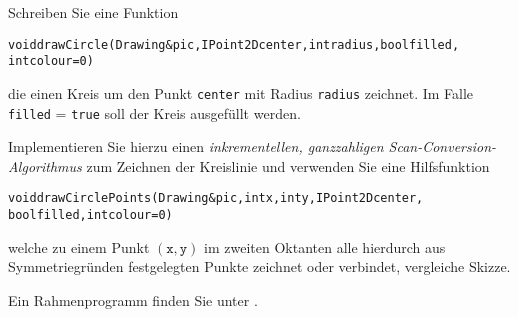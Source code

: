 %
Schreiben Sie eine Funktion
\begin{alltt}
   void drawCircle(Drawing& pic, IPoint2D center, int radius, bool filled,
                   int colour = 0)
\end{alltt}
die einen Kreis um den Punkt \texttt{center} mit Radius
\texttt{radius} zeichnet. Im Falle \texttt{filled} = \texttt{true}
soll der Kreis ausgefüllt werden. 

Implementieren Sie hierzu einen
\emph{inkrementellen, ganzzahligen Scan-Conversion-Algorithmus} zum
Zeichnen der Kreislinie und verwenden Sie eine Hilfsfunktion
\begin{alltt}
   void drawCirclePoints(Drawing& pic, int x, int y, IPoint2D center,
                         bool filled, int colour = 0)
\end{alltt}
welche zu einem Punkt $(\texttt{x}, \texttt{y})$ im zweiten Oktanten
alle hierdurch aus Symmetriegründen festgelegten Punkte
zeichnet oder verbindet, vergleiche Skizze.
\begin{center}
  \scalebox{0.9}{}
\end{center}

Ein Rahmenprogramm finden Sie unter .
